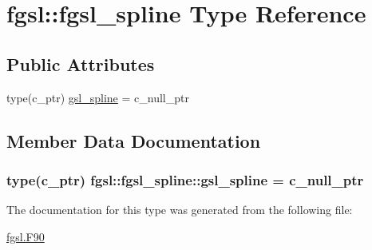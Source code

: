 \hypertarget{structfgsl_1_1fgsl__spline}{}\section{fgsl\+:\+:fgsl\+\_\+spline Type Reference}
\label{structfgsl_1_1fgsl__spline}
\subsection*{Public Attributes}
\begin{DoxyCompactItemize}
\item 
type(c\+\_\+ptr) \hyperlink{structfgsl_1_1fgsl__spline_a4f3ae97855a4a1a7fef3927d5b65f453}{gsl\+\_\+spline} = c\+\_\+null\+\_\+ptr
\end{DoxyCompactItemize}


\subsection{Member Data Documentation}
\hypertarget{structfgsl_1_1fgsl__spline_a4f3ae97855a4a1a7fef3927d5b65f453}{}
\subsubsection[{gsl\+\_\+spline}]{\setlength{\rightskip}{0pt plus 5cm}type(c\+\_\+ptr) fgsl\+::fgsl\+\_\+spline\+::gsl\+\_\+spline = c\+\_\+null\+\_\+ptr}\label{structfgsl_1_1fgsl__spline_a4f3ae97855a4a1a7fef3927d5b65f453}


The documentation for this type was generated from the following file\+:\begin{DoxyCompactItemize}
\item 
\hyperlink{fgsl_8F90}{fgsl.\+F90}\end{DoxyCompactItemize}
